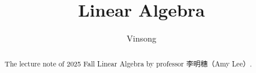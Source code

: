 \documentclass[a4paper]{report}
\author{Vinsong}
\title{Linear Algebra}
\begin{document}
\maketitle

\begin{abstract}
    The lecture note of 2025 Fall Linear Algebra by professor 李明穗（Amy Lee）.
\end{abstract}


\newpage

\tableofcontents

\setcounter{chapter}{-1}

\end{document}
